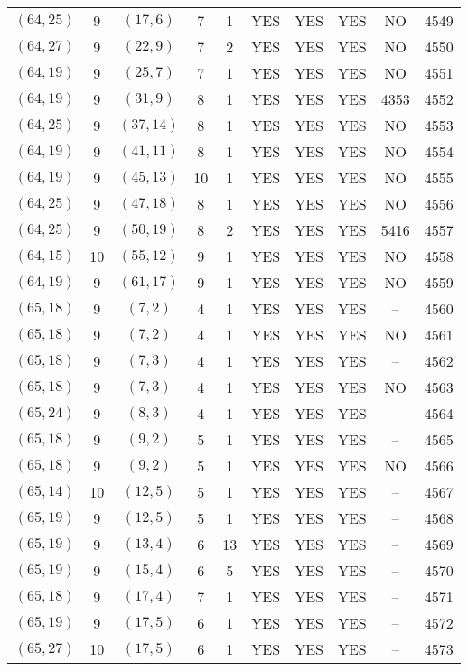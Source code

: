\begin{longtable}{|c|c|c|c|c|c|c|c|c|c|}
$(64, 25)$ & 9 & $(17, 6)$ & 7 & 1 & YES & YES & YES & NO & 4549\\
$(64, 27)$ & 9 & $(22, 9)$ & 7 & 2 & YES & YES & YES & NO & 4550\\
$(64, 19)$ & 9 & $(25, 7)$ & 7 & 1 & YES & YES & YES & NO & 4551\\
$(64, 19)$ & 9 & $(31, 9)$ & 8 & 1 & YES & YES & YES & 4353 & 4552\\
$(64, 25)$ & 9 & $(37, 14)$ & 8 & 1 & YES & YES & YES & NO & 4553\\
$(64, 19)$ & 9 & $(41, 11)$ & 8 & 1 & YES & YES & YES & NO & 4554\\
$(64, 19)$ & 9 & $(45, 13)$ & 10 & 1 & YES & YES & YES & NO & 4555\\
$(64, 25)$ & 9 & $(47, 18)$ & 8 & 1 & YES & YES & YES & NO & 4556\\
$(64, 25)$ & 9 & $(50, 19)$ & 8 & 2 & YES & YES & YES & 5416 & 4557\\
$(64, 15)$ & 10 & $(55, 12)$ & 9 & 1 & YES & YES & YES & NO & 4558\\
$(64, 19)$ & 9 & $(61, 17)$ & 9 & 1 & YES & YES & YES & NO & 4559\\
$(65, 18)$ & 9 & $(7, 2)$ & 4 & 1 & YES & YES & YES & -- & 4560\\
$(65, 18)$ & 9 & $(7, 2)$ & 4 & 1 & YES & YES & YES & NO & 4561\\
$(65, 18)$ & 9 & $(7, 3)$ & 4 & 1 & YES & YES & YES & -- & 4562\\
$(65, 18)$ & 9 & $(7, 3)$ & 4 & 1 & YES & YES & YES & NO & 4563\\
$(65, 24)$ & 9 & $(8, 3)$ & 4 & 1 & YES & YES & YES & -- & 4564\\
$(65, 18)$ & 9 & $(9, 2)$ & 5 & 1 & YES & YES & YES & -- & 4565\\
$(65, 18)$ & 9 & $(9, 2)$ & 5 & 1 & YES & YES & YES & NO & 4566\\
$(65, 14)$ & 10 & $(12, 5)$ & 5 & 1 & YES & YES & YES & -- & 4567\\
$(65, 19)$ & 9 & $(12, 5)$ & 5 & 1 & YES & YES & YES & -- & 4568\\
$(65, 19)$ & 9 & $(13, 4)$ & 6 & 13 & YES & YES & YES & -- & 4569\\
$(65, 19)$ & 9 & $(15, 4)$ & 6 & 5 & YES & YES & YES & -- & 4570\\
$(65, 18)$ & 9 & $(17, 4)$ & 7 & 1 & YES & YES & YES & -- & 4571\\
$(65, 19)$ & 9 & $(17, 5)$ & 6 & 1 & YES & YES & YES & -- & 4572\\
$(65, 27)$ & 10 & $(17, 5)$ & 6 & 1 & YES & YES & YES & -- & 4573\\

\end{longtable}
